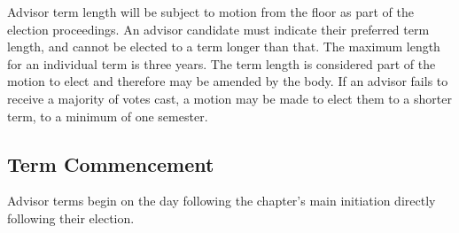 Advisor term length will be subject to motion from the
floor as part of the election proceedings. An advisor candidate must indicate their preferred
term length, and cannot be elected to a term longer than that. The maximum length
for an individual term is three years. The term length is considered part of the motion to
elect and therefore may be amended by the body. If an advisor fails to receive a majority
of votes cast, a motion may be made to elect them to a shorter term, to a minimum of one
semester.


\subsection{Term Commencement} \label{III.6}

Advisor terms begin on the day following the
chapter’s main initiation directly following their election.